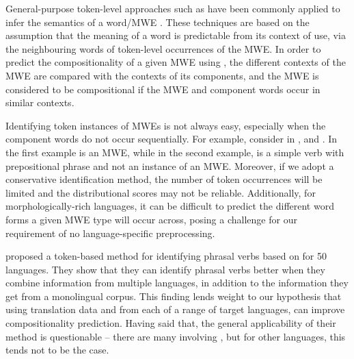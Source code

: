 \documentclass[output=paper,modfonts,nonflat]{langsci/langscibook}
\begin{document}
General-purpose token-level approaches such as 
have been commonly applied to infer the semantics of a word/MWE
\citep{Schone2001,Baldwin:2003,reddy2011a}. These techniques are based on
the assumption that the meaning of a word is predictable from its
context of use, via the neighbouring words of token-level
occurrences of the MWE. In order to predict the compositionality of a
given MWE using , the different contexts of the
MWE are compared with the contexts of its components, and the MWE is
considered to be compositional if the MWE and component words occur in
similar contexts.

Identifying token instances of MWEs is not always easy, especially when
the component words do not occur sequentially. For example, consider
 in , and
. In the first
example  is an MWE, while in the second example, 
is a simple verb with prepositional phrase and not an instance of an
MWE. Moreover, if we adopt a conservative identification method, the
number of token occurrences will be limited and the distributional
scores may not be reliable. Additionally, for morphologically-rich
languages, it can be difficult to predict the different word forms a
given MWE type will occur across, posing a challenge for our requirement
of no language-specific preprocessing.

\citet{pichotta2013} proposed a token-based method for identifying
 phrasal verbs based on  for 50 languages. They
show that they can identify phrasal verbs better when they combine
information from multiple languages, in addition to the information
they get from a monolingual corpus. This finding lends weight to our
hypothesis that using translation data and 
from each of a range of target languages, can improve compositionality
prediction. Having said that, the general applicability of their
method is questionable -- there are many  involving
, but for other languages, this tends not to be the case.
\end{document}
